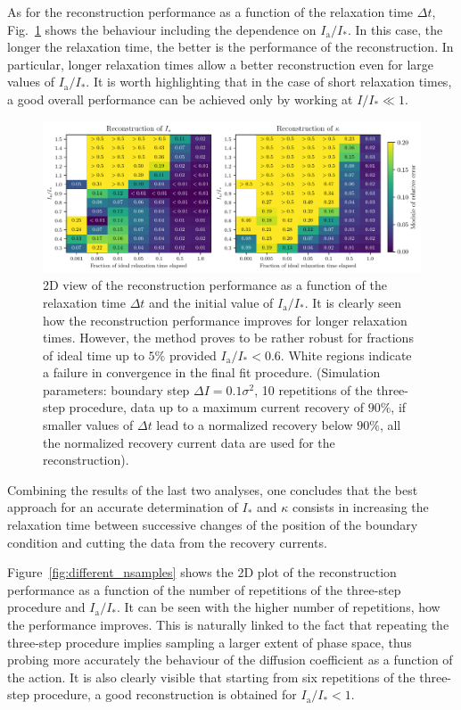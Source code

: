 As for the reconstruction performance as a function of the  relaxation time $\Delta t$, Fig.~\ref{fig:different_time} shows the behaviour including the dependence on $I_\mathrm{a}/I_\ast$. In this case, the longer the relaxation time, the better is the performance of the reconstruction. In particular, longer relaxation times allow a better reconstruction even for large values of $I_\mathrm{a}/I_\ast$. It is worth highlighting that in the case of short relaxation times, a good overall performance can be achieved only by working at $I/I_\ast \ll 1$.
%
\begin{figure}[htp]
    \centering
    \includegraphics[width=\textwidth]{4_probing_the_diffusive_behavior/figs/final/MULTI_different_time.pdf}
    \caption{2D view of the reconstruction performance as a function of the relaxation time $\Delta t$ and the initial value of $I_\mathrm{a}/I_\ast$. It is clearly seen how the reconstruction performance improves for longer relaxation times. However, the method proves to be rather robust for fractions of ideal time up to $5\%$ provided $I_\mathrm{a}/I_\ast < 0.6$. White regions indicate a failure in convergence in the final fit procedure. (Simulation parameters: boundary step $\Delta I=0.1 \sigma^2$, 10 repetitions of the three-step procedure, data up to a maximum current recovery of $90\%$, if smaller values of $\Delta t$ lead to a normalized recovery below $90\%$, all the normalized recovery current data are used for the reconstruction).}
    \label{fig:different_time}
\end{figure}
%
Combining the results of the last two analyses, one concludes that the best approach for an accurate determination of $I_\ast$ and $\kappa$ consists in increasing the relaxation time between successive changes of the position of the boundary condition and cutting the data from the recovery currents. 

Figure~\ref{fig:different_nsamples} shows the 2D plot of the reconstruction performance as a function of the number of repetitions of the three-step procedure and $I_\mathrm{a}/I_\ast$. It can be seen with the higher number of repetitions, how the performance improves. This is naturally linked to the fact that repeating the three-step procedure implies sampling a larger extent of phase space, thus probing more accurately the behaviour of the diffusion coefficient as a function of the action. It is also clearly visible that starting from six repetitions of the three-step procedure, a good reconstruction is obtained for $I_\mathrm{a}/I_\ast < 1$.

